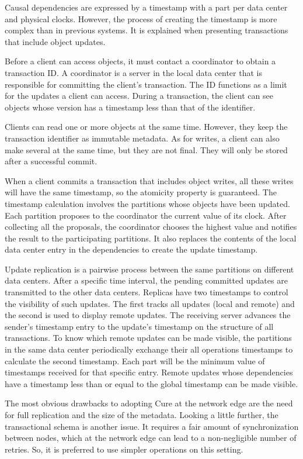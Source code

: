 Causal dependencies are expressed by a timestamp with a part per data center and physical clocks. However, the process of creating the timestamp is more complex than in previous systems. It is explained when presenting transactions that include object updates. 

Before a client can access objects, it must contact a coordinator to obtain a transaction ID. A coordinator is a server in the local data center that is responsible for committing the client's transaction. The ID functions as a limit for the updates a client can access. During a transaction, the client can see objects whose version has a timestamp less than that of the identifier. 

Clients can read one or more objects at the same time. However, they keep the transaction identifier as immutable metadata. As for writes, a client can also make several at the same time, but they are not final. They will only be stored after a successful commit. 

When a client commits a transaction that includes object writes, all these writes will have the same timestamp, so the atomicity property is guaranteed. The timestamp calculation involves the partitions whose objects have been updated. Each partition proposes to the coordinator the current value of its clock. After collecting all the proposals, the coordinator chooses the highest value and notifies the result to the participating partitions. It also replaces the contents of the local data center entry in the dependencies to create the update timestamp. 

Update replication is a pairwise process between the same partitions on different data centers. After a specific time interval, the pending committed updates are transmitted to the other data centers. Replicas have two timestamps to control the visibility of such updates. The first tracks all updates (local and remote) and the second is used to display remote updates. The receiving server advances the sender's timestamp entry to the update's timestamp on the structure of all transactions. To know which remote updates can be made visible, the partitions in the same data center periodically exchange their all operations timestamps to calculate the second timestamp. Each part will be the minimum value of timestamps received for that specific entry. Remote updates whose dependencies have a timestamp less than or equal to the global timestamp can be made visible. 

The most obvious drawbacks to adopting Cure at the network edge are the need for full replication and the size of the metadata. Looking a little further, the transactional schema is another issue. It requires a fair amount of synchronization between nodes, which at the network edge can lead to a non-negligible number of retries. So, it is preferred to use simpler operations on this setting.

